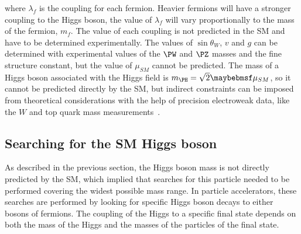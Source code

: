 where $\lambda_{f}$ is the coupling for each fermion. Heavier fermions will have a stronger coupling to the Higgs boson, the value of $\lambda_{f}$ will vary proportionally to the mass of the fermion, $m_{f}$. The value of each coupling is not predicted in the \gls{SM} and have to be determined experimentally. The values of $\sin{\theta_{W}}$, $v$ and $g$ can be determined with experimental values of the $\PW$ and $\PZ$ masses and the fine structure constant, but the value of $\mu_{SM}$ cannot be predicted. The mass of a Higgs boson associated with the Higgs field is $m_{\PH}=\sqrt{2}\mu_{SM}$, so it cannot be predicted directly by the \gls{SM}, but indirect constraints can be imposed from theoretical considerations with the help of precision electroweak data, like the $W$ and top quark mass measurements~\cite{SITE:lepewwg}.

\subsection{Searching for the SM Higgs boson}
\label{SUBSECTION:Theory_SM_SearchingSMHiggs}


As described in the previous section, the Higgs boson mass is not directly predicted by the \gls{SM}, which implied that searches for this particle needed to be performed covering the widest possible mass range. In particle accelerators, these searches are performed by looking for specific Higgs boson decays to either bosons of fermions. The coupling of the Higgs to a specific final state depends on both the mass of the Higgs and the masses of the particles of the final state. 


